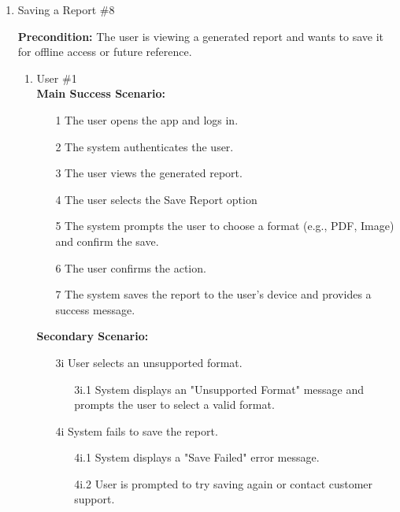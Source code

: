 \documentclass[]{article}
\begin{document}
\begin{enumerate}[{\bf BE1.}]
\item Saving a Report \#8

    \textbf{Precondition:} The user is viewing a generated report and wants to save it for offline access or future reference.

    \begin{enumerate}[{\bf VP1.}]
        \item User \#1 \\

            \textbf{Main Success Scenario:}
            \begin{enumerate}
                \item[1] The user opens the app and logs in.
                \item[2] The system authenticates the user.
                \item[3] The user views the generated report.
                \item[4] The user selects the Save Report option
                \item[5] The system prompts the user to choose a format (e.g., PDF, Image) and confirm the save.
                \item[6] The user confirms the action.
                \item[7] The system saves the report to the user’s device and provides a success message.
            \end{enumerate}

            \textbf{Secondary Scenario:}
            \begin{enumerate}
                \item[3i] User selects an unsupported format.
                \begin{enumerate}
                    \item[3i.1] System displays an "Unsupported Format" message and prompts the user to select a valid format.
                \end{enumerate}
                \item[4i] System fails to save the report.
                \begin{enumerate}
                    \item[4i.1] System displays a "Save Failed" error message.
                    \item[4i.2] User is prompted to try saving again or contact customer support.
                \end{enumerate}
            \end{enumerate}
    \end{enumerate}


\end{enumerate}
\end{document}
